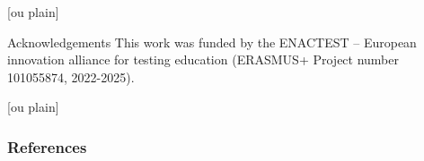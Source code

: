 \documentclass[aspectratio=169]{beamer}
\begin{document}
[ou plain]
\begin{frame}{Acknowledgements}
    This work was funded by the ENACTEST -- European innovation alliance for testing education (ERASMUS+ Project number 101055874, 2022-2025). %
\end{frame}

[ou plain]
\begin{frame}[allowframebreaks]
    \frametitle{References}
    \printbibliography
\end{frame}
\end{document}

